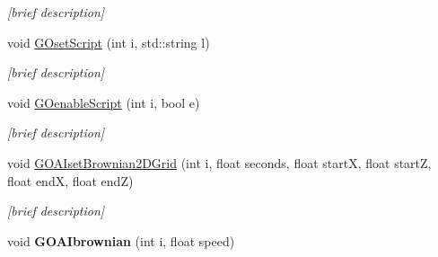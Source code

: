 \begin{DoxyCompactItemize}
\begin{DoxyCompactList}\small\item\em \mbox{[}brief description\mbox{]} \end{DoxyCompactList}\item 
void \hyperlink{class_i_s_e_a9ff79951a53706f0b2b389ebbc6ffbda}{G\-Oset\-Script} (int i, std\-::string l)
\begin{DoxyCompactList}\small\item\em \mbox{[}brief description\mbox{]} \end{DoxyCompactList}\item 
void \hyperlink{class_i_s_e_a4c94a5a8f901ded152b805d1bf1d5b11}{G\-Oenable\-Script} (int i, bool e)
\begin{DoxyCompactList}\small\item\em \mbox{[}brief description\mbox{]} \end{DoxyCompactList}\item 
void \hyperlink{class_i_s_e_a443346a92ad4c23323dcc1e26e77ffdf}{G\-O\-A\-Iset\-Brownian2\-D\-Grid} (int i, float seconds, float start\-X, float start\-Z, float end\-X, float end\-Z)
\begin{DoxyCompactList}\small\item\em \mbox{[}brief description\mbox{]} \end{DoxyCompactList}\item 
\hypertarget{class_i_s_e_a0f0aa7828b4e48a99a93e43810d0acb4}{void {\bfseries G\-O\-A\-Ibrownian} (int i, float speed)}\label{class_i_s_e_a0f0aa7828b4e48a99a93e43810d0acb4}


\end{DoxyCompactItemize}
